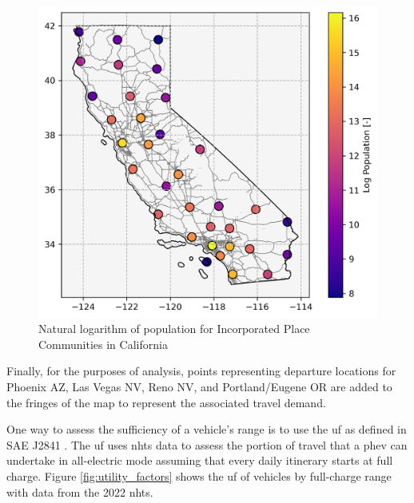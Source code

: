 \begin{figure}[H]
	\centering
	\includegraphics[width = \linewidth]{figs/california_incorporated_communities.png}
	\caption{Natural logarithm  of population for Incorporated Place Communities in California}
	\label{fig:california_incorporated_communities}
\end{figure}

Finally, for the purposes of analysis, points representing departure locations for Phoenix AZ, Las Vegas NV, Reno NV, and Portland/Eugene OR are added to the fringes of the map to represent the associated travel demand.


One way to assess the sufficiency of a vehicle's range is to use the \gls{uf} as defined in SAE J2841 \cite{SAE_J2481}. The \gls{uf} uses \gls{nhts} data \cite{NHTS_2022} to assess the portion of travel that a \gls{phev} can undertake in all-electric mode assuming that every daily itinerary starts at full charge. Figure \ref{fig:utility_factors} shows the \gls{uf} of vehicles by full-charge range with data from the 2022 \gls{nhts}. 

